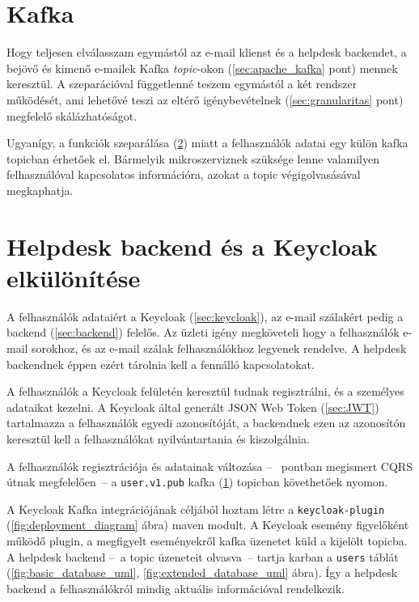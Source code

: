 \section{Kafka}\label{sec:implementacio_kafka}
Hogy teljesen elválasszam egymástól az e-mail klienst és a helpdesk backendet, a bejövő és kimenő e-mailek Kafka \emph{topic}-okon (\ref{sec:apache_kafka} pont) mennek keresztül. A szeparációval függetlenné teszem egymástól a két rendszer működését, ami lehetővé teszi az eltérő igénybevételnek (\ref{sec:granularitas} pont) megfelelő skálázhatóságot.

Ugyanígy, a funkciók szeparálása (\ref{sec:backend_keycloak_separation}) miatt a felhasználók adatai egy külön kafka topicban érhetőek el. Bármelyik mikroszerviznek szüksége lenne valamilyen felhasználóval kapcsolatos információra, azokat a topic végigolvasásával megkaphatja.



\section{Helpdesk backend és a Keycloak elkülönítése}\label{sec:backend_keycloak_separation}
A felhasználók adataiért a Keycloak (\ref{sec:keycloak}), az e-mail szálakért pedig a backend (\ref{sec:backend}) felelős. Az üzleti igény megköveteli hogy a felhasználók e-mail sorokhoz, és az e-mail szálak felhasználókhoz legyenek rendelve. A helpdesk backendnek éppen ezért tárolnia kell a fennálló kapcsolatokat.

A felhasználók a Keycloak felületén keresztül tudnak regisztrálni, és a személyes adataikat kezelni. A Keycloak által generált JSON Web Token (\ref{sec:JWT}) tartalmazza a felhasználók egyedi azonosítóját, a backendnek ezen az azonosítón keresztül kell a felhasználókat nyilvántartania és kiszolgálnia.

A felhasználók regisztrációja és adatainak változása --~ pontban megismert CQRS útnak megfelelően~-- a \texttt{user.v1.pub} kafka (\ref{sec:implementacio_kafka}) topicban követhetőek nyomon.

A Keycloak Kafka integrációjának céljából hoztam létre a \texttt{keycloak-plugin} (\ref{fig:deployment_diagram} ábra) maven modult. A Keycloak esemény figyelőként működő plugin, a megfigyelt eseményekről kafka üzenetet küld a kijelölt topicba. A helpdesk backend --~a topic üzeneteit olvasva~--   tartja karban a \texttt{users} táblát (\ref{fig:basic_database_uml}, \ref{fig:extended_database_uml} ábra). Így a helpdesk backend a felhasználókról mindig aktuális információval rendelkezik.


